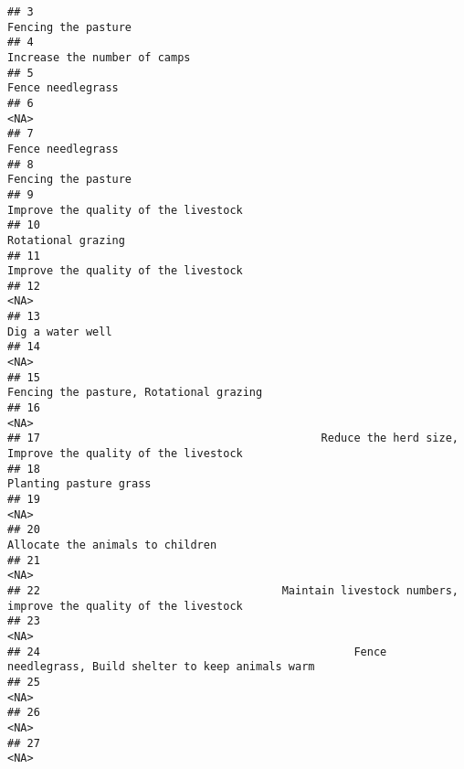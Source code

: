 \documentclass[
]{article}
\begin{document}
\begin{verbatim}
## 3                                                                                   Fencing the pasture
## 4                                                                          Increase the number of camps
## 5                                                                                     Fence needlegrass
## 6                                                                                                  <NA>
## 7                                                                                     Fence needlegrass
## 8                                                                                   Fencing the pasture
## 9                                                                  Improve the quality of the livestock
## 10                                                                                   Rotational grazing
## 11                                                                 Improve the quality of the livestock
## 12                                                                                                 <NA>
## 13                                                                                     Dig a water well
## 14                                                                                                 <NA>
## 15                                                              Fencing the pasture, Rotational grazing
## 16                                                                                                 <NA>
## 17                                           Reduce the herd size, Improve the quality of the livestock
## 18                                                                               Planting pasture grass
## 19                                                                                                 <NA>
## 20                                                                     Allocate the animals to children
## 21                                                                                                 <NA>
## 22                                     Maintain livestock numbers, improve the quality of the livestock
## 23                                                                                                 <NA>
## 24                                                Fence needlegrass, Build shelter to keep animals warm
## 25                                                                                                 <NA>
## 26                                                                                                 <NA>
## 27                                                                                                 <NA>

\end{verbatim}
\end{document}

